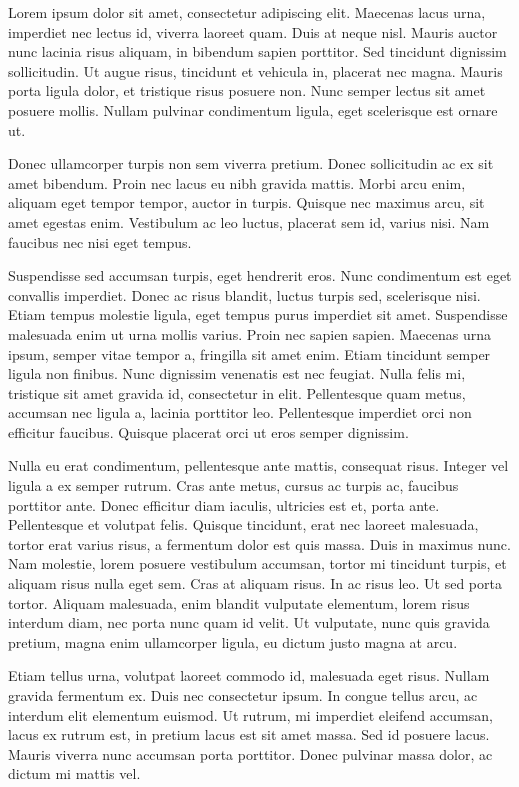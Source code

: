 Lorem ipsum dolor sit amet, consectetur adipiscing elit. Maecenas lacus urna, imperdiet nec lectus id, viverra laoreet quam. Duis at neque nisl. Mauris auctor nunc lacinia risus aliquam, in bibendum sapien porttitor. Sed tincidunt dignissim sollicitudin. Ut augue risus, tincidunt et vehicula in, placerat nec magna. Mauris porta ligula dolor, et tristique risus posuere non. Nunc semper lectus sit amet posuere mollis. Nullam pulvinar condimentum ligula, eget scelerisque est ornare ut. 

Donec ullamcorper turpis non sem viverra pretium. Donec sollicitudin ac ex sit amet bibendum. Proin nec lacus eu nibh gravida mattis. Morbi arcu enim, aliquam eget tempor tempor, auctor in turpis. Quisque nec maximus arcu, sit amet egestas enim. Vestibulum ac leo luctus, placerat sem id, varius nisi. Nam faucibus nec nisi eget tempus. 

Suspendisse sed accumsan turpis, eget hendrerit eros. Nunc condimentum est eget convallis imperdiet. Donec ac risus blandit, luctus turpis sed, scelerisque nisi. Etiam tempus molestie ligula, eget tempus purus imperdiet sit amet. Suspendisse malesuada enim ut urna mollis varius. Proin nec sapien sapien. Maecenas urna ipsum, semper vitae tempor a, fringilla sit amet enim. Etiam tincidunt semper ligula non finibus. Nunc dignissim venenatis est nec feugiat. Nulla felis mi, tristique sit amet gravida id, consectetur in elit. Pellentesque quam metus, accumsan nec ligula a, lacinia porttitor leo. Pellentesque imperdiet orci non efficitur faucibus. Quisque placerat orci ut eros semper dignissim. 

Nulla eu erat condimentum, pellentesque ante mattis, consequat risus. Integer vel ligula a ex semper rutrum. Cras ante metus, cursus ac turpis ac, faucibus porttitor ante. Donec efficitur diam iaculis, ultricies est et, porta ante. Pellentesque et volutpat felis. Quisque tincidunt, erat nec laoreet malesuada, tortor erat varius risus, a fermentum dolor est quis massa. Duis in maximus nunc. Nam molestie, lorem posuere vestibulum accumsan, tortor mi tincidunt turpis, et aliquam risus nulla eget sem. Cras at aliquam risus. In ac risus leo. Ut sed porta tortor. Aliquam malesuada, enim blandit vulputate elementum, lorem risus interdum diam, nec porta nunc quam id velit. Ut vulputate, nunc quis gravida pretium, magna enim ullamcorper ligula, eu dictum justo magna at arcu. 

Etiam tellus urna, volutpat laoreet commodo id, malesuada eget risus. Nullam gravida fermentum ex. Duis nec consectetur ipsum. In congue tellus arcu, ac interdum elit elementum euismod. Ut rutrum, mi imperdiet eleifend accumsan, lacus ex rutrum est, in pretium lacus est sit amet massa. Sed id posuere lacus. Mauris viverra nunc accumsan porta porttitor. Donec pulvinar massa dolor, ac dictum mi mattis vel. 
